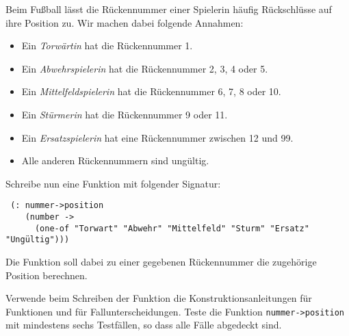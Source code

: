 \begin{aufgabe}
  Beim Fußball lässt die Rückennummer einer Spielerin
  häufig Rückschlüsse auf ihre Position zu. Wir machen dabei folgende
  Annahmen:
  \begin{itemize}
  \item Ein \emph{Torwärtin} hat die Rückennummer 1.
  \item Ein \emph{Abwehrspielerin} hat die Rückennummer 2, 3, 4 oder 5.
  \item Ein \emph{Mittelfeldspielerin} hat die Rückennummer 6, 7, 8 oder 10.
  \item Ein \emph{Stürmerin} hat die Rückennummer 9 oder 11.
  \item Ein \emph{Ersatzspielerin} hat eine Rückennummer zwischen 12 und 99.
  \item Alle anderen Rückennummern sind ungültig.
  \end{itemize}
 
  Schreibe nun eine Funktion mit folgender Signatur:
  
  {\small
\begin{verbatim}
 (: nummer->position
    (number ->
      (one-of "Torwart" "Abwehr" "Mittelfeld" "Sturm" "Ersatz" "Ungültig")))
\end{verbatim}
  }

  Die Funktion soll dabei zu einer gegebenen Rückennummer die
  zugehörige Position berechnen.

  Verwende beim Schreiben der Funktion die
  Konstruktionsanleitungen für Funktionen und für
  Fallunterscheidungen.  Teste die Funktion
  \texttt{nummer->position} mit mindestens sechs Testfällen, so dass
  alle Fälle abgedeckt sind.
\end{aufgabe}


